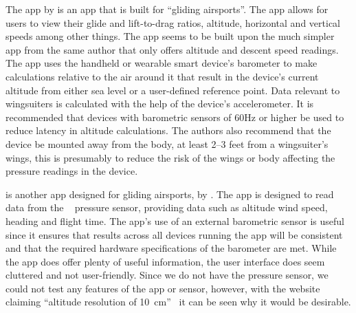 \documentclass[11pt, a4paper, twocolumn]{article}
\begin{document}
The  app by \textcite{pfm_technologies_llc_l/d_2015} is an app that is built for ``gliding airsports''. The app allows for users to view their glide and lift-to-drag ratios, altitude, horizontal and vertical speeds among other things. The app seems to be built upon the much simpler  app from the same author that only offers altitude and descent speed readings.
The  app uses the handheld or wearable smart device's barometer to make calculations relative to the air around it that result in the device's current altitude from either sea level or a user-defined reference point. Data relevant to wingsuiters is calculated with the help of the device's accelerometer. It is recommended that devices with barometric sensors of 60Hz or higher be used to reduce latency in altitude calculations. The authors also recommend that the device be mounted away from the body, at least 2--3 feet from a wingsuiter's wings, this is presumably to reduce the risk of the wings or body affecting the pressure readings in the device.

 is another app designed for gliding airsports, by \textcite{dickie_blueflyvario_2016}. The app is designed to read data from the ~\cite{noauthor_blueflyvario_nodate} pressure sensor, providing data such as altitude wind speed, heading and flight time.
The app's use of an external barometric sensor is useful since it ensures that results across all devices running the app will be consistent and that the required hardware specifications of the barometer are met.
While the app does offer plenty of useful information, the user interface does seem cluttered and not user-friendly. Since we do not have the  pressure sensor, we could not test any features of the app or sensor, however, with the website claiming ``altitude resolution of \SI{10}{\centi\metre}''~\cite{noauthor_blueflyvario_nodate} it can be seen why it would be desirable.
\end{document}
